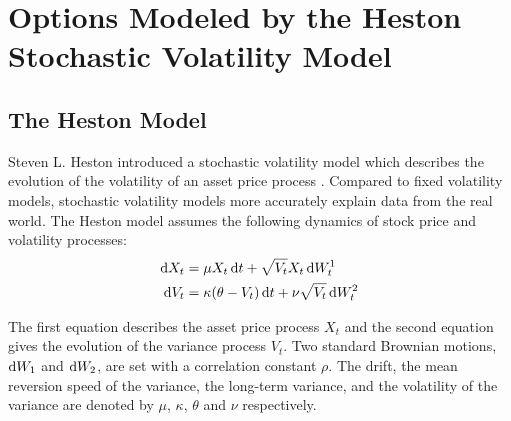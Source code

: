 \documentclass{ws-ijfe}
\begin{document}
\section{Options Modeled by the Heston Stochastic Volatility Model}
\subsection{The Heston Model}
Steven L. Heston introduced a stochastic volatility model which describes the evolution of the volatility of an asset price process \cite{Heston1993}. Compared to fixed volatility models, stochastic volatility models more accurately explain data from the real world.
The Heston model assumes the following dynamics of stock price and volatility processes:
 \begin{align}
    \d X_t & =\mu X_t\,\d t+\sqrt{V_t}X_t\,\d W_t^1\label{eq1}\\
    \d V_t &= \kappa (\theta-V_t)\,\d t +\nu\sqrt{V_t}\,\d W_t^2\label{eq2}
  \end{align}

The first equation describes the asset price process $X_t$ and the second equation gives the evolution of the variance process $V_t$. Two standard Brownian motions, $\mathrm{d} W_1$ and $\mathrm{d} W_2$, are set with a correlation constant $\rho$. The drift, the mean reversion speed of the variance, the long-term variance, and the volatility of the variance are denoted by $\mu$, $\kappa$, $\theta$ and $\nu$ respectively.

\end{document}
